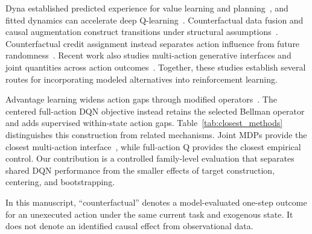 \documentclass[11pt]{article}
\begin{document}
\color{red}%
Dyna established predicted experience for value learning and planning~\cite{sutton1991dyna}, and fitted dynamics can accelerate deep Q-learning~\cite{gu2016continuous}. Counterfactual data fusion and causal augmentation construct transitions under structural assumptions~\cite{forney2017counterfactual,armengol2024caiac}. Counterfactual credit assignment instead separates action influence from future randomness~\cite{mesnard2021counterfactual}. Recent work also studies multi-action generative interfaces and joint quantities across action outcomes~\cite{kaya2026joint}. Together, these studies establish several routes for incorporating modeled alternatives into reinforcement learning.
\color{black}%

\color{red}%
Advantage learning widens action gaps through modified operators~\cite{bellemare2016gap}. The centered full-action DQN objective instead retains the selected Bellman operator and adds supervised within-state action gaps. Table~\ref{tab:closest_methods} distinguishes this construction from related mechanisms. Joint MDPs provide the closest multi-action interface~\cite{kaya2026joint}, while full-action Q provides the closest empirical control. Our contribution is a controlled family-level evaluation that separates shared DQN performance from the smaller effects of target construction, centering, and bootstrapping.

In this manuscript, ``counterfactual'' denotes a model-evaluated one-step outcome for an unexecuted action under the same current task and exogenous state. It does not denote an identified causal effect from observational data.
\end{document}

